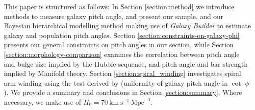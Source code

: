 This paper is structured as follows: In Section \ref{section:method} we introduce methods to measure galaxy pitch angle, and present our sample, and our Bayesian hierarchical modelling method making use of \textit{Galaxy Builder} to estimate galaxy and population pitch angles. Section \ref{section:constraints-on-galaxy-phi} presents our general constraints on pitch angles in our section, while Section \ref{section:morphology-comparison} examines the correlation between pitch angle and bulge size implied by the Hubble sequence, and pitch angle and bar strength implied by Manifold theory. Section \ref{section:spiral_winding} investigates spiral arm winding using the test derived by \cite{2019arXiv190910291P} (uniformity of galaxy pitch angle in $\cot\;\phi$). We provide a summary and conclusions in Section \ref{section:summary}.  Where necessary, we make use of $H_0 = 70\ \text{km}\ \text{s}^{-1}\ \text{Mpc}^{-1}$.
